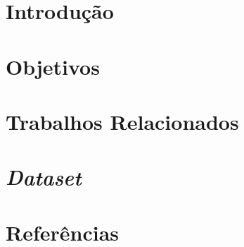 \documentclass[compress,aspectratio=169]{beamer}
\subtitle[Reconhecimento de Padrões]  {Classificação de Imagens aéreas}
\begin{document}
\begindocument

\section{Introdução}
    
    
\section{Objetivos}
    
    
\section{Trabalhos Relacionados}
    

\section{\textit{Dataset}}
    

\section{Referências}
    
\end{document}
